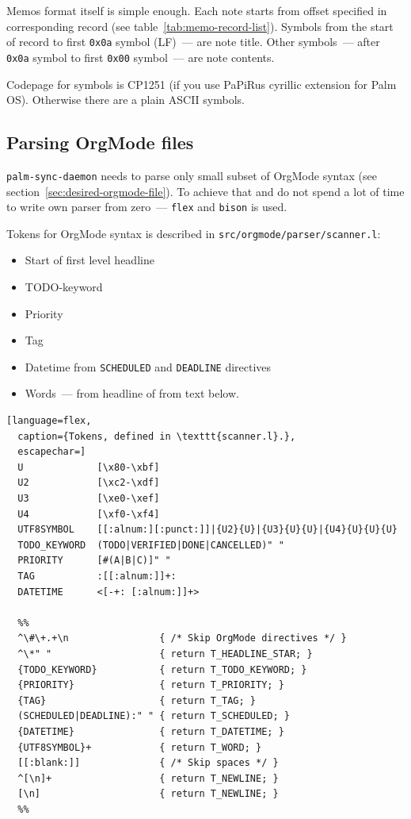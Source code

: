 \documentclass[a4paper,12pt,oneside]{scrartcl}
\begin{document}
Memos format itself is simple enough. Each note starts from offset specified in
corresponding record (see table~\ref{tab:memo-record-list}). Symbols from the
start of record to first \texttt{0x0a} symbol (LF)~--- are note title. Other
symbols~--- after \texttt{0x0a} symbol to first \texttt{0x00} symbol~--- are
note contents.

Codepage for symbols is CP1251 (if you use PaPiRus cyrillic extension for Palm
OS). Otherwise there are a plain ASCII symbols.

\subsection{Parsing OrgMode files}
\label{sec:pars-orgm-files}

\texttt{palm-sync-daemon} needs to parse only small subset of OrgMode syntax
(see section~\ref{sec:desired-orgmode-file}). To achieve that and do not spend a
lot of time to write own parser from zero~--- \texttt{flex} and \texttt{bison}
is used.

Tokens for OrgMode syntax is described in \texttt{src/orgmode/parser/scanner.l}:
\begin{itemize}
\item Start of first level headline
\item TODO-keyword
\item Priority
\item Tag
\item Datetime from \texttt{SCHEDULED} and \texttt{DEADLINE} directives
\item Words~--- from headline of from text below.
\end{itemize}

\begin{lstlisting}[language=flex,
  caption={Tokens, defined in \texttt{scanner.l}.},
  escapechar=]
  U             [\x80-\xbf]
  U2            [\xc2-\xdf]
  U3            [\xe0-\xef]
  U4            [\xf0-\xf4]
  UTF8SYMBOL    [[:alnum:][:punct:]]|{U2}{U}|{U3}{U}{U}|{U4}{U}{U}{U}
  TODO_KEYWORD  (TODO|VERIFIED|DONE|CANCELLED)" "
  PRIORITY      [#(A|B|C)]" "
  TAG           :[[:alnum:]]+:
  DATETIME      <[-+: [:alnum:]]+>

  %%
  ^\#\+.+\n                { /* Skip OrgMode directives */ }
  ^\*" "                   { return T_HEADLINE_STAR; }
  {TODO_KEYWORD}           { return T_TODO_KEYWORD; }
  {PRIORITY}               { return T_PRIORITY; }
  {TAG}                    { return T_TAG; }
  (SCHEDULED|DEADLINE):" " { return T_SCHEDULED; }
  {DATETIME}               { return T_DATETIME; }
  {UTF8SYMBOL}+            { return T_WORD; }
  [[:blank:]]              { /* Skip spaces */ }
  ^[\n]+                   { return T_NEWLINE; }
  [\n]                     { return T_NEWLINE; }
  %%
\end{lstlisting}
\end{document}
